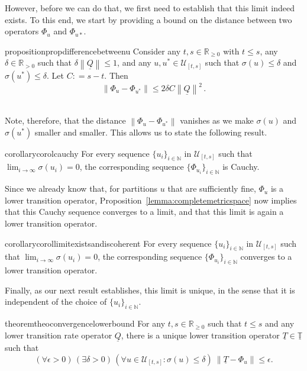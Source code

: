 \documentclass[10pt,a4paper]{paper}
\theoremstyle{definition}
\newcommand{\nats}{\mathbb{N}}
\newcommand{\reals}{\mathbb{R}}
\newcommand{\realspos}{\reals_{>0}}
\newcommand{\realsnonneg}{\reals_{\geq 0}}
\newcommand{\lt}{\underline{T}}
\newcommand{\lrate}{\underline{Q}}
\newcommand{\norm}[1]{\left\lVert #1 \right\rVert}
\newcommand{\coloneqq}{:\!=}
\begin{document}
However, before we can do that, we first need to establish that this limit indeed exists. To this end, we start by providing a bound on the distance between two operators $\Phi_u$ and $\Phi_{u*}$.

\begin{restatable}{proposition}{propdifferencebetweenu}
\label{prop:differencebetweenu}
Consider any $t,s\in\realsnonneg$ with $t\leq s$, any $\delta\in\realspos$ such that $\delta\norm{\lrate}\leq1$, and any $u,u^*\in\mathcal{U}_{[t,s]}$ such that $\sigma(u)\leq\delta$ and $\sigma(u^*)\leq\delta$. Let $C\coloneqq s-t$. Then
\begin{equation*}
\norm{\Phi_u-\Phi_{u^*}}\leq 2\delta C\norm{\lrate}^2\,.
\end{equation*}\\[-27pt]
\end{restatable}

Note, therefore, that the distance $\norm{\Phi_u - \Phi_{u^*}}$ vanishes as we make $\sigma(u)$ and $\sigma(u^*)$ smaller and smaller. This allows us to state the following result.

\begin{restatable}{corollary}{corolcauchy}
\label{corol:cauchy}
For every sequence $\{u_i\}_{i\in\nats}$ in $\mathcal{U}_{[t,s]}$ such that $\lim_{i\to\infty}\sigma(u_i)=0$, the corresponding sequence $\{\Phi_{u_i}\}_{i\in\nats}$ is Cauchy.
\end{restatable}

Since we already know that, for partitions $u$ that are sufficiently fine, $\Phi_u$ is a lower transition operator, Proposition~\ref{lemma:completemetricspace} now implies that this Cauchy sequence converges to a limit, and that this limit is again a lower transition operator.

\begin{restatable}{corollary}{corollimitexistsandiscoherent}
\label{corol:limitexistsandiscoherent}
For every sequence $\{u_i\}_{i\in\nats}$ in $\mathcal{U}_{[t,s]}$ such that $\lim_{i\to\infty}\sigma(u_i)=0$, the corresponding sequence $\{\Phi_{u_i}\}_{i\in\nats}$ converges to a lower transition operator.
\end{restatable}

Finally, as our next result establishes, this limit is unique, in the sense that it is independent of the choice of $\{u_i\}_{i\in\nats}$.

\begin{restatable}{theorem}{theoconvergencelowerbound}
\label{theo:convergencelowerbound}
For any $t,s\in\realsnonneg$ such that $t\leq s$ and any lower transition rate operator $\lrate$, there is a unique lower transition operator $\lt\in\underline{\mathbb{T}}$ such that 
\begin{equation}\label{eq:theo:convergencelowerbound}
(\forall\epsilon>0)\,
(\exists\delta>0)\,
(\forall u\in\mathcal{U}_{[t,s]}\colon\sigma(u)\leq\delta)~\norm{\lt - \Phi_u}\leq\epsilon.
\end{equation}
\end{restatable}
\end{document}
